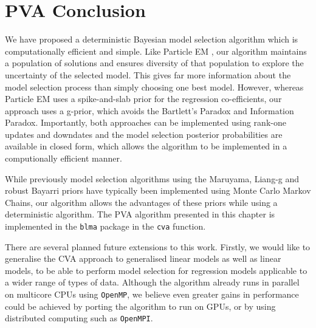 \section{PVA Conclusion}

We have proposed a deterministic Bayesian model selection algorithm which is computationally efficient
and simple. Like Particle EM \cite{Rockova2017}, our algorithm maintains a population of solutions and ensures
diversity of that population to explore the uncertainty of the selected model. This gives far more information
about the model selection process than simply choosing one best model. However, whereas Particle EM uses
a spike-and-slab prior for the regression co-efficients, our approach uses a g-prior, which avoids 
the Bartlett's Paradox and Information Paradox. Importantly, both approaches can be implemented using rank-one
updates and downdates and the model selection posterior probabilities are available in closed form,
which allows the algorithm to be implemented in a computionally efficient manner.

While previously model selection algorithms using the Maruyama, Liang-g and robust Bayarri priors have
typically been implemented using Monte Carlo Markov Chains, our algorithm allows the advantages of these
priors while using a deterministic algorithm. The PVA algorithm  presented in this chapter is implemented in
the {\tt blma} package in the {\tt cva} function.

There are several planned future extensions to this work. Firstly, we would like to generalise the CVA
approach to generalised linear models as well as linear models, to be able to perform model selection for
regression models applicable to a wider range of types of data. Although the algorithm already runs in
parallel on multicore CPUs using \texttt{OpenMP}, we believe even greater gains in performance could be
achieved by porting the algorithm to run on GPUs, or by using distributed computing such as \texttt{OpenMPI}.